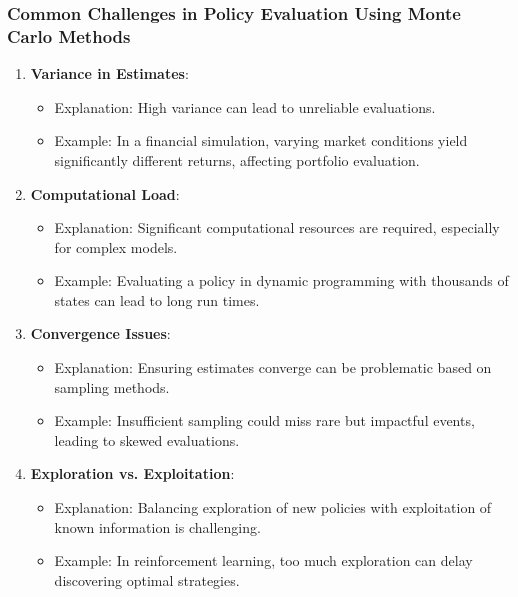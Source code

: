 \documentclass[aspectratio=169]{beamer}
\begin{document}
\begin{frame}[fragile]
    \frametitle{Common Challenges in Policy Evaluation Using Monte Carlo Methods}
    \begin{enumerate}
        \item \textbf{Variance in Estimates}:
            \begin{itemize}
                \item Explanation: High variance can lead to unreliable evaluations.
                \item Example: In a financial simulation, varying market conditions yield significantly different returns, affecting portfolio evaluation.
            \end{itemize}
        \item \textbf{Computational Load}:
            \begin{itemize}
                \item Explanation: Significant computational resources are required, especially for complex models.
                \item Example: Evaluating a policy in dynamic programming with thousands of states can lead to long run times.
            \end{itemize}
        \item \textbf{Convergence Issues}:
            \begin{itemize}
                \item Explanation: Ensuring estimates converge can be problematic based on sampling methods.
                \item Example: Insufficient sampling could miss rare but impactful events, leading to skewed evaluations.
            \end{itemize}
        \item \textbf{Exploration vs. Exploitation}:
            \begin{itemize}
                \item Explanation: Balancing exploration of new policies with exploitation of known information is challenging.
                \item Example: In reinforcement learning, too much exploration can delay discovering optimal strategies.
            \end{itemize}
    \end{enumerate}
\end{frame}
\end{document}

